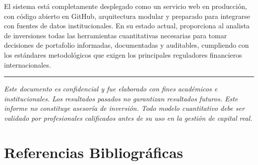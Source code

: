 \documentclass[11pt,a4paper]{article}
\begin{document}
El sistema está completamente desplegado como un servicio web en producción, con código
abierto en GitHub, arquitectura modular y preparado para integrarse con fuentes de datos
institucionales. En su estado actual, proporciona al analista de inversiones todas las
herramientas cuantitativas necesarias para tomar decisiones de portafolio informadas,
documentadas y auditables, cumpliendo con los estándares metodológicos que exigen los
principales reguladores financieros internacionales.

\vspace{1cm}
{\color{accentgold}\rule{\linewidth}{0.6pt}}
\begin{center}
\small\color{darkgray}
\textit{Este documento es confidencial y fue elaborado con fines académicos e institucionales.
Los resultados pasados no garantizan resultados futuros. Este informe no constituye asesoría
de inversión. Todo modelo cuantitativo debe ser validado por profesionales calificados antes
de su uso en la gestión de capital real.}
\end{center}


\newpage
\section{Referencias Bibliográficas}
\end{document}

